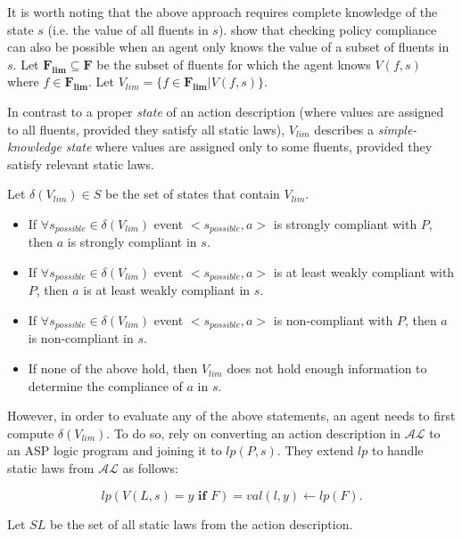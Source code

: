 It is worth noting that the above approach requires complete knowledge of the state $s$ (i.e. the value of all fluents in $s$).
\citet{gelfond_authorization_2008} show that checking policy compliance can also be possible when an agent only knows the value of a subset of fluents in $s$.
Let $\boldsymbol{F_{lim}} \subseteq \boldsymbol{F}$ be the subset of fluents for which the agent knows $V(f, s)$ where $f \in \boldsymbol{F_{lim}}$.
Let $V_{lim} = \{ f \in \boldsymbol{F_{lim}} | V(f, s)\}$.

\begin{definition}
    In contrast to a proper \textit{state} of an action description (where values are assigned to all fluents, provided they satisfy all static laws), $V_{lim}$ describes a \textit{simple-knowledge state} where values are assigned only to some fluents, provided they satisfy relevant static laws.
\end{definition}

Let $\delta(V_{lim}) \in S$ be the set of states that contain $V_{lim}$.

\begin{itemize}
    \item If $\forall s_{possible} \in \delta(V_{lim})$ event $<s_{possible}, a>$ is strongly compliant with $P$, then $a$ is strongly compliant in $s$.
    \item If $\forall s_{possible} \in \delta(V_{lim})$ event $<s_{possible}, a>$ is at least weakly compliant with $P$, then $a$ is at least weakly compliant in $s$.
    \item If $\forall s_{possible} \in \delta(V_{lim})$ event $<s_{possible}, a>$ is non-compliant with $P$, then $a$ is non-compliant in $s$.
    \item If none of the above hold, then $V_{lim}$ does not hold enough information to determine the compliance of $a$ in $s$.
\end{itemize}

However, in order to evaluate any of the above statements, an agent needs to first compute $\delta(V_{lim})$.
To do so, \citet{gelfond_authorization_2008} rely on converting an action description in $\mathcal{AL}$ to an ASP logic program and joining it to $lp(P, s)$.
They extend $lp$ to handle static laws from $\mathcal{AL}$ as follows:

\[
lp(V(L,s)=y \textbf{ if } F) = val(l, y) \leftarrow lp(F).
\]

Let $SL$ be the set of all static laws from the action description.

